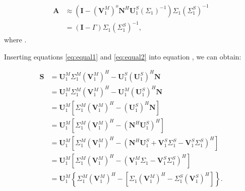\begin{equation}
\label{eq:Ader}
\begin{split}
\mathbf{A}&\approx (\mathbf{I}-(\mathbf{V}_1^M)^{o}\mathbf{N}^H\mathbf{U}_1^S(\Sigma_1)^{-1})\Sigma_1(\Sigma_1^S)^{-1}\\
&=(\mathbf{I}-\Gamma)\Sigma_1(\Sigma_1^S)^{-1},
\end{split}
\end{equation}
where .

Inserting equations \ref{eq:equal1} and \ref{eq:equal2} into equation \dlo{\ref{eq:tsvd22}}\wen{\ref{eq:tsvd222}}, we can obtain:

\begin{equation}
\label{eq:S22}
\begin{split}
\mathbf{S} &= \mathbf{U}_1^M\Sigma_1^M(\mathbf{V}_1^M)^H - \mathbf{U}_1^S\left(\mathbf{U}_1^S\right)^H\mathbf{N}\\
 &= \mathbf{U}_1^M\Sigma_1^M(\mathbf{V}_1^M)^H - \mathbf{U}_1^M\left(\mathbf{U}_1^S\right)^H\mathbf{N}\\
&=\mathbf{U}_1^M\left[\Sigma_1^M(\mathbf{V}_1^M)^H-  (\mathbf{U}_1^S)^H\mathbf{N}\right]\\
&=\mathbf{U}_1^M\left[\Sigma_1^M(\mathbf{V}_1^M)^H-  (\mathbf{N}^H\mathbf{U}_1^S)^H\right]\\
&=\mathbf{U}_1^M\left[\Sigma_1^M(\mathbf{V}_1^M)^H-  (\mathbf{N}^H\mathbf{U}_1^S+\mathbf{V}_1^S\Sigma_1^S-\mathbf{V}_1^S\Sigma_1^S)^H\right]\\
&=\mathbf{U}_1^M\left[\Sigma_1^M(\mathbf{V}_1^M)^H- (\mathbf{V}_1^M\Sigma_1-\mathbf{V}_1^S\Sigma_1^S)^H\right]\\
&=\mathbf{U}_1^M\left\{\Sigma_1^M(\mathbf{V}_1^M)^H- \left[\Sigma_1(\mathbf{V}_1^M)^H-\Sigma_1^S(\mathbf{V}_1^S)^H\right]\right\}.
\end{split}
\end{equation}



